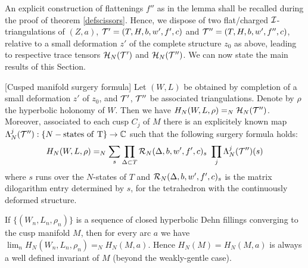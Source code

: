 An explicit construction of flattenings $f''$ as in the lemma shall be
recalled during the proof of theorem \ref{defscissors}. Hence, we
dispose of two flat/charged ${\mathcal I}$-triangulations of $(Z,a)$, ${\mathcal T}'=
(T,H,b,w',f',c)$ and ${\mathcal T}''=(T,H,b,w',f'',c)$, relative to a small
deformation $z'$ of the complete structure $z_0$ as above, leading to
respective trace tensors ${\mathcal H}_N({\mathcal T}')$ and ${\mathcal H}_N({\mathcal T}'')$. We can now
state the main results of this Section. 

\begin{teo}\label{defscissors}
{\rm[Cusped manifold surgery formula]} Let $(W,L)$ be obtained by
completion of a small deformation $z'$ of $z_0$, and ${\mathcal T}'$, ${\mathcal T}''$
be associated triangulations. Denote by $\rho$ the hyperbolic holonomy
of $W$. Then we have $H_N(W,L,\rho) =_N
{\mathcal H}_N({\mathcal T}'')$. Moreover, associated to each cusp $C_j$ of $M$ there is
an explicitely known map $\Lambda_N^j({\mathcal T}''): \{ N-{\rm states\ of\ T}
\}\rightarrow \mathbb{C}$ such that the following {\rm surgery formula}
holds:
$$H_N(W,L,\rho) =_N \sum_s \prod_{\Delta \subset T}
    {\mathcal R}_N(\Delta,b,w',f',c)_s\ \prod_j\Lambda_N^j({\mathcal T}'')(s)$$ where
    $s$ runs over the $N$-states of $T$ and
    ${\mathcal R}_N(\Delta,b,w',f',c)_s$ is the matrix dilogarithm entry
    determined by $s$, for the tetrahedron with the continuously
    deformed structure.
\end{teo}
\begin{cor}\label{DF-converge} 
If $\{(W_n,L_n,\rho_n)\}$ is a sequence of closed hyperbolic Dehn
fillings converging to the cusp manifold $M$, then for every arc $a$ we
have $\textstyle \lim_n H_N (W_n,L_n,\rho_n)=_N H_N(M,a)$. Hence
$H_N(M)=H_N(M,a)$ is always a well defined invariant of $M$ (beyond
the weakly-gentle case).
\end{cor}

